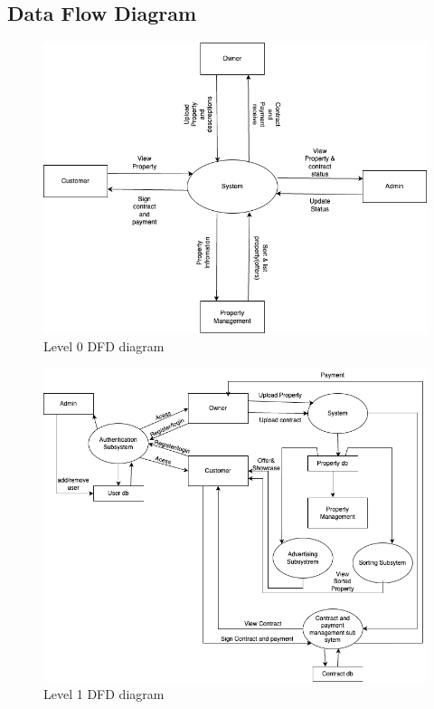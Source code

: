 \subsection{Data Flow Diagram}
\begin{figure}[h]
    \centering
    \includegraphics[width=150mm]{Dfdlvl0.png}
    \caption{Level 0 DFD diagram}
    \label{fig:level 0 DFD}
\end{figure}
\newpage
\begin{figure}[h]
    \centering
    \includegraphics[width=170mm]{Dfd_lvl1.drawio.png}
    \caption{Level 1 DFD diagram}
    \label{fig:level 1 DFD}
\end{figure}

